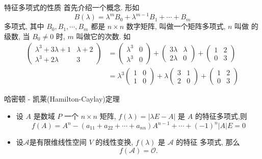 \documentclass[13pt]{beamer}
\def\A{\mathscr{A}}
\def\O{\mathscr{O}}
\begin{document}
\begin{frame}{特征多项式的性质} 
首先介绍一个概念. 形如
\[
B(\lambda)=\lambda^{m} B_{0}+\lambda^{m-1} B_{1}+\cdots+B_{m}
\]
多项式, 其中 $B_{0}, B_{1}, \cdots, B_{m}$ 都是 $n \times n$ 数字矩阵, 叫做一个矩阵多项式, $n$ 叫做 的级数, 当 $B_{0} \neq 0$ 时, $m$ 叫做它的次数. 如
\begin{align*}
\left(\begin{array}{cc}\lambda^{3}+3 \lambda+1 & \lambda+2 \\ \lambda^{3}+2 \lambda & 3\end{array}\right)
& =\left(\begin{array}{cc}\lambda^{3} & 0 \\ \lambda^{3} & 0\end{array}\right)+\left(\begin{array}{cc}3 \lambda & \lambda \\ 2 \lambda & 0\end{array}\right)+\left(\begin{array}{cc}1 & 2 \\ 0 & 3\end{array}\right)\\
& =\lambda^{3}\left(\begin{array}{ll}
1 & 0 \\
1 & 0
\end{array}\right)+\lambda\left(\begin{array}{ll}
3 & 1 \\
2 & 0
\end{array}\right)+\left(\begin{array}{ll}
1 & 2 \\
0 & 3
\end{array}\right)
\end{align*}

\end{frame}

\begin{frame}{哈密顿 - 凯莱(Hamilton-Caylay)定理 }

\begin{itemize}
	\item 
设 $A$ 是数域 $P$ 一个 $n \times n$ 矩阵, $f(\lambda)=|\lambda {E}-{A}|$ 是 ${A}$ 的特征多项式,则
\[
f({A})={A}^{n}-\left(a_{11}+a_{22}+\cdots+a_{n n}\right) {A}^{n-1}+\cdots+(-1)^{n}|{A}| {E}=0
\]

\item 设$\A$是有限维线性空间 $V$ 的线性变换, $f(\lambda)$ 是 $\mathscr{A}$ 的特征 多项式, 那么 $$f(\A)=\O.$$

\end{itemize}
\end{frame}
\end{document}
